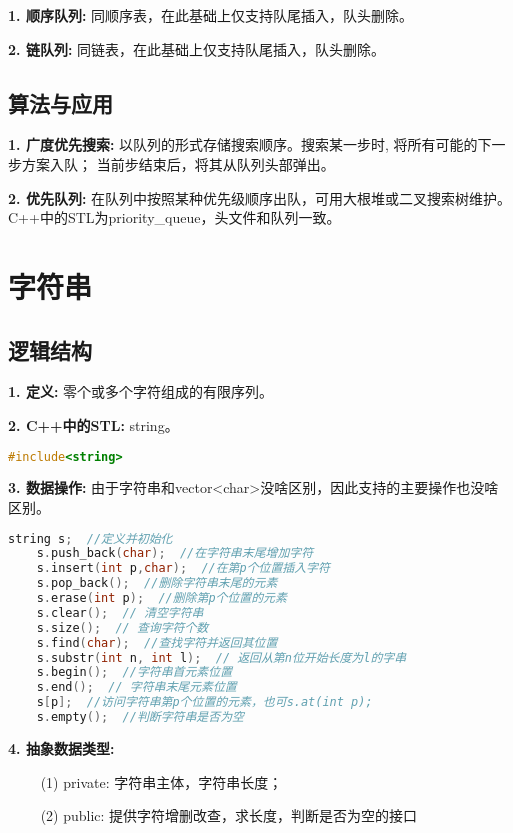 \textbf{1. 顺序队列: }同顺序表，在此基础上仅支持队尾插入，队头删除。

\textbf{2. 链队列: }同链表，在此基础上仅支持队尾插入，队头删除。

\subsection{算法与应用}

\textbf{1. 广度优先搜索: }以队列的形式存储搜索顺序。搜索某一步时, 将所有可能的下一步方案入队； 当前步结束后，将其从队列头部弹出。

\textbf{2. 优先队列: }在队列中按照某种优先级顺序出队，可用大根堆或二叉搜索树维护。C++中的STL为priority\_queue，头文件和队列一致。

\section{字符串}

\subsection{逻辑结构}

\textbf{1. 定义: }零个或多个字符组成的有限序列。

\textbf{2. C++中的STL: }string。
\begin{lstlisting}[language=C++]
    #include<string>
\end{lstlisting}

\textbf{3. 数据操作: }由于字符串和vector<char>没啥区别，因此支持的主要操作也没啥区别。

\begin{lstlisting}[language=C++]
    string s;  //定义并初始化
    s.push_back(char);  //在字符串末尾增加字符
    s.insert(int p,char);  //在第p个位置插入字符
    s.pop_back();  //删除字符串末尾的元素
    s.erase(int p);  //删除第p个位置的元素
    s.clear();  // 清空字符串
    s.size();  // 查询字符个数
    s.find(char);  //查找字符并返回其位置
    s.substr(int n, int l);  // 返回从第n位开始长度为l的字串
    s.begin();  //字符串首元素位置
    s.end();  // 字符串末尾元素位置
    s[p];  //访问字符串第p个位置的元素，也可s.at(int p); 
    s.empty();  //判断字符串是否为空
\end{lstlisting}

\textbf{4. 抽象数据类型: }

~~~~ (1) private: 字符串主体，字符串长度；

~~~~ (2) public: 提供字符增删改查，求长度，判断是否为空的接口

